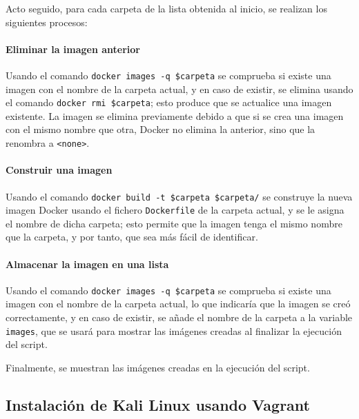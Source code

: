             Acto seguido, para cada carpeta de la lista obtenida al inicio, se realizan los siguientes procesos:

            \paragraph{Eliminar la imagen anterior}

                Usando el comando \verb|docker images -q $carpeta| se comprueba si existe una imagen con el nombre de la carpeta actual, y en caso de existir, se elimina usando el comando \verb|docker rmi $carpeta|; esto produce que se actualice una imagen existente. La imagen se elimina previamente debido a que si se crea una imagen con el mismo nombre que otra, Docker no elimina la anterior, sino que la renombra a \texttt{<none>}.

            \paragraph{Construir una imagen}

                Usando el comando \texttt{docker build -t \$carpeta \$carpeta/} se construye la nueva imagen Docker usando el fichero \texttt{Dockerfile} de la carpeta actual, y se le asigna el nombre de dicha carpeta; esto permite que la imagen tenga el mismo nombre que la carpeta, y por tanto, que sea más fácil de identificar.

            \paragraph{Almacenar la imagen en una lista}

                Usando el comando \verb|docker images -q $carpeta| se comprueba si existe una imagen con el nombre de la carpeta actual, lo que indicaría que la imagen se creó correctamente, y en caso de existir, se añade el nombre de la carpeta a la variable \texttt{images}, que se usará para mostrar las imágenes creadas al finalizar la ejecución del script.

            Finalmente, se muestran las imágenes creadas en la ejecución del script.

        \subsection{Instalación de Kali Linux usando Vagrant}

